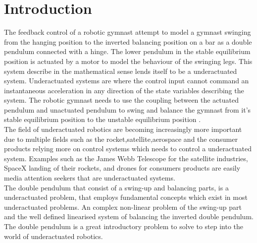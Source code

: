 \documentclass[a4paper,12pt]{article}
\begin{document}
%	
	\newpage
	\tableofcontents
	\newpage
	
	\section{Introduction}
	The feedback control of a robotic gymnast attempt to model a gymnast swinging from the hanging position to the inverted balancing position on a bar as a double pendulum connected with a hinge. The lower pendulum in the stable equilibrium position is actuated by a motor to model the behaviour of the swinging legs. This system describe in the mathematical sense lends itself to be a underactuated system. Underactuated systems are where the control input cannot command an instantaneous acceleration in any direction of the state variables describing the system. The robotic gymnast needs to use the coupling between the actuated pendulum and unactuated pendulum to swing and balance the gymnast from it's stable equilibrium position to the unstable equilibrium position \cite{tedrake}.
	\\
	
	The field of underactuated robotics are becoming increasingly more important due to multiple fields such as the rocket,satellite,aerospace and the consumer products relying more on control systems which needs to control a underactuated system. Examples such as the James Webb Telescope for the satellite industries, SpaceX landing of their rockets, and drones for consumers products are easily media attention seekers that are underactuated systems. 
	\\
	
	The double pendulum that consist of a swing-up and balancing parts, is a underactuated problem, that employs fundamental concepts which exist in most underactuated problems. An complex non-linear problem of the swing-up part and the well defined linearised system of balancing the inverted double pendulum. The double pendulum is a great introductory problem to solve to step into the world of underactuated robotics.
	\\
	
\end{document}
